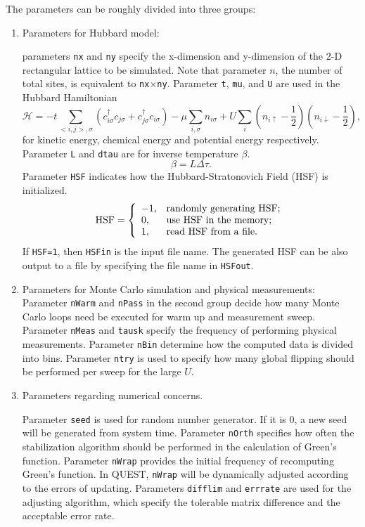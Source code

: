 \documentclass[12pt]{article}
\begin{document}
The parameters can be roughly divided into three groups:
\begin{enumerate}
\item Parameters for Hubbard model:

parameters \verb|nx| and \verb|ny|
specify the x-dimension and y-dimension of the 2-D rectangular lattice to
be simulated. Note that parameter $n$, the number of total sites,
is equivalent to \verb|nx|$\times$\verb|ny|.
Parameter \verb|t|, \verb|mu|, and \verb|U| are used in the Hubbard Hamiltonian
$$\mathcal{H}=-t \sum_{<i,j>, \sigma}(c^{\dag}_{i\sigma}c_{j\sigma}+c^{\dag}_{j\sigma}c_{i\sigma})
             -\mu \sum_{i, \sigma}n_{i\sigma}
             +U \sum_{i} (n_{i\uparrow}-\frac{1}{2})(n_{i\downarrow}-\frac{1}{2}),$$
for kinetic energy, chemical energy and potential energy respectively.
Parameter \verb|L| and \verb|dtau| are for inverse temperature $\beta$.
$$\beta = L \Delta\tau.$$
Parameter \verb"HSF" indicates how the Hubbard-Stratonovich Field (HSF) is initialized.
$$
\mbox{HSF} = \left\{
                      \begin{array}{ll}
                        -1, & \hbox{randomly generating HSF;} \\
                        0, & \hbox{use HSF in the memory;} \\
                        1, & \hbox{read HSF from a file.}
                      \end{array}
                    \right.
$$
If \verb"HSF=1", then \verb"HSFin" is the input file name. The generated HSF can be also output to a file by specifying the file name in \verb"HSFout".

\item Parameters for Monte Carlo simulation and physical measurements:
Parameter \verb|nWarm| and \verb|nPass| in the second group decide how many Monte Carlo loops
need be executed for warm up and measurement sweep. Parameter \verb|nMeas| and \verb|tausk| specify the frequency
of performing physical measurements. Parameter \verb|nBin|
determine how the computed data is divided into bins. Parameter \verb"ntry" is used to specify how many global flipping should be performed per sweep for the large $U$.

\item Parameters regarding numerical concerns.

Parameter \verb|seed| is used for random number generator.
If it is 0, a new seed will be generated from system time.
Parameter \verb|nOrth| specifies how often the stabilization algorithm
should be performed in the calculation of Green's function.
Parameter \verb|nWrap| provides the initial frequency of recomputing Green's function.
In QUEST, \verb|nWrap| will be dynamically adjusted according to the errors
of updating. Parameters \verb|difflim| and \verb|errrate| are used for the adjusting
algorithm, which specify the tolerable matrix difference and the acceptable error rate.
\end{enumerate}
\end{document}
